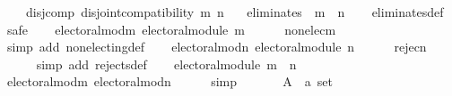 \begin{isabellebody}
\ \ \ \ disj{\isacharunderscore}{\kern0pt}comp{\isacharcolon}{\kern0pt}\ {\isachardoublequoteopen}disjoint{\isacharunderscore}{\kern0pt}compatibility\ m\ n{\isachardoublequoteclose}\isanewline
\ \ \ {\isachardoublequoteopen}eliminates\ {}\ {\isacharparenleft}{\kern0pt}m\ {\isasymparallel}\isactrlsub {\isasymup}\ n{\isacharparenright}{\kern0pt}{\isachardoublequoteclose}\isanewline
%
\isadelimproof
\ \ %
\endisadelimproof
%
\isatagproof
{}\isamarkupfalse%
\ eliminates{\isacharunderscore}{\kern0pt}def\isanewline
{}\isamarkupfalse%
\ {\isacharparenleft}{\kern0pt}safe{\isacharparenright}{\kern0pt}\isanewline
\ \ \isamarkupfalse%
\ electoral{\isacharunderscore}{\kern0pt}mod{\isacharunderscore}{\kern0pt}m{\isacharcolon}{\kern0pt}\ {\isachardoublequoteopen}electoral{\isacharunderscore}{\kern0pt}module\ m{\isachardoublequoteclose}\isanewline
\ \ \ \ \isamarkupfalse%
\ non{\isacharunderscore}{\kern0pt}elec{\isacharunderscore}{\kern0pt}m\isanewline
\ \ \ \ \isamarkupfalse%
\ {\isacharparenleft}{\kern0pt}simp\ add{\isacharcolon}{\kern0pt}\ non{\isacharunderscore}{\kern0pt}electing{\isacharunderscore}{\kern0pt}def{\isacharparenright}{\kern0pt}\isanewline
\ \ \isamarkupfalse%
\ electoral{\isacharunderscore}{\kern0pt}mod{\isacharunderscore}{\kern0pt}n{\isacharcolon}{\kern0pt}\ {\isachardoublequoteopen}electoral{\isacharunderscore}{\kern0pt}module\ n{\isachardoublequoteclose}\isanewline
\ \ \ \ \isamarkupfalse%
\ rejec{\isacharunderscore}{\kern0pt}n{\isacharunderscore}{\kern0pt}{}\isanewline
\ \ \ \ \isamarkupfalse%
\ {\isacharparenleft}{\kern0pt}simp\ add{\isacharcolon}{\kern0pt}\ rejects{\isacharunderscore}{\kern0pt}def{\isacharparenright}{\kern0pt}\isanewline
\ \ \isamarkupfalse%
\ {\isachardoublequoteopen}electoral{\isacharunderscore}{\kern0pt}module\ {\isacharparenleft}{\kern0pt}m\ {\isasymparallel}\isactrlsub {\isasymup}\ n{\isacharparenright}{\kern0pt}{\isachardoublequoteclose}\isanewline
\ \ \ \ \isamarkupfalse%
\ electoral{\isacharunderscore}{\kern0pt}mod{\isacharunderscore}{\kern0pt}m\ electoral{\isacharunderscore}{\kern0pt}mod{\isacharunderscore}{\kern0pt}n\isanewline
\ \ \ \ \isamarkupfalse%
\ simp\isanewline
{}\isamarkupfalse%
\isanewline
\ \ \isamarkupfalse%
\isanewline
\ \ \ \ A\ {\isacharcolon}{\kern0pt}{\isacharcolon}{\kern0pt}\ {\isachardoublequoteopen}{\isacharprime}{\kern0pt}a\ set{\isachardoublequoteclose}\ \isanewline

\end{isabellebody}
